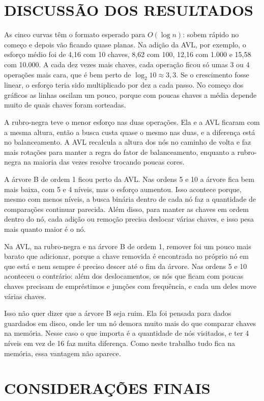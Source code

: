 \section{DISCUSSÃO DOS RESULTADOS}

As cinco curvas têm o formato esperado para $O(\log n)$: sobem rápido no começo e depois vão ficando quase planas. Na adição da AVL, por exemplo, o esforço médio foi de 4,16 com 10 chaves, 8,62 com 100, 12,16 com 1.000 e 15,58 com 10.000. A cada dez vezes mais chaves, cada operação ficou só umas 3 ou 4 operações mais cara, que é bem perto de $\log_2 10 \approx 3{,}3$. Se o crescimento fosse linear, o esforço teria sido multiplicado por dez a cada passo. No começo dos gráficos as linhas oscilam um pouco, porque com poucas chaves a média depende muito de quais chaves foram sorteadas.

A rubro-negra teve o menor esforço nas duas operações. Ela e a AVL ficaram com a mesma altura, então a busca custa quase o mesmo nas duas, e a diferença está no balanceamento. A AVL recalcula a altura dos nós no caminho de volta e faz mais rotações para manter a regra do fator de balanceamento, enquanto a rubro-negra na maioria das vezes resolve trocando poucas cores.

A árvore B de ordem 1 ficou perto da AVL. Nas ordens 5 e 10 a árvore fica bem mais baixa, com 5 e 4 níveis, mas o esforço aumentou. Isso acontece porque, mesmo com menos níveis, a busca binária dentro de cada nó faz a quantidade de comparações continuar parecida. Além disso, para manter as chaves em ordem dentro do nó, cada adição ou remoção precisa deslocar várias chaves, e isso pesa mais quanto maior é o nó.

Na AVL, na rubro-negra e na árvore B de ordem 1, remover foi um pouco mais barato que adicionar, porque a chave removida é encontrada no próprio nó em que está e nem sempre é preciso descer até o fim da árvore. Nas ordens 5 e 10 aconteceu o contrário: além dos deslocamentos, os nós que ficam com poucas chaves precisam de empréstimos e junções com frequência, e cada um deles move várias chaves.

Isso não quer dizer que a árvore B seja ruim. Ela foi pensada para dados guardados em disco, onde ler um nó demora muito mais do que comparar chaves na memória. Nesse caso o que importa é a quantidade de nós visitados, e ter 4 níveis em vez de 16 faz muita diferença. Como neste trabalho tudo fica na memória, essa vantagem não aparece.

\section{CONSIDERAÇÕES FINAIS}

